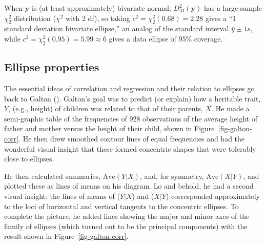 \documentclass[
  letterpaper,
  10pt,
  krantz2]{krantz}
\begin{document}
When \(\mathbf{y}\) is (at least approximately) bivariate normal,
\(D_M^2(\mathbf{y})\) has a large-sample \(\chi^2_2\) distribution
(\(\chi^2\) with 2 df), so taking \(c^2 = \chi^2_2 (0.68) = 2.28\) gives
a ``1 standard deviation bivariate ellipse,'' an analog of the standard
interval \(\bar{y} \pm 1 s\), while
\(c^2 = \chi^2_2 (0.95) = 5.99 \approx 6\) gives a data ellipse of 95\%
coverage.

\subsection{Ellipse properties}\label{ellipse-properties}

The essential ideas of correlation and regression and their relation to
ellipses go back to Galton (). Galton's
goal was to predict (or explain) how a heritable trait, \(Y\), (e.g.,
height) of children was related to that of their parents, \(X\). He made
a semi-graphic table of the frequencies of 928 observations of the
average height of father and mother versus the height of their child,
shown in Figure~\ref{fig-galton-corr}. He then drew smoothed contour
lines of equal frequencies and had the wonderful visual insight that
these formed concentric shapes that were tolerably close to ellipses.

He then calculated summaries, \(\text{Ave}(Y | X)\), and, for symmetry,
\(\text{Ave}(X | Y)\), and plotted these as lines of means on his
diagram. Lo and behold, he had a second visual insight: the lines of
means of (\(Y | X\)) and (\(X | Y\)) corresponded approximately to the
loci of horizontal and vertical tangents to the concentric ellipses. To
complete the picture, he added lines showing the major and minor axes of
the family of ellipses (which turned out to be the principal components)
with the result shown in Figure~\ref{fig-galton-corr}.
\end{document}
